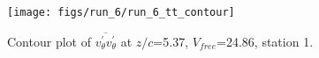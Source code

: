 \begin{figure}[H]
\centering
\texttt{[image: figs/run\_6/run\_6\_tt\_contour]}
\caption{Contour plot of $\overline{v_{\theta}^{\prime} v_{\theta}^{\prime}}$ at $z/c$=5.37, $V_{free}$=24.86, station 1.}
\label{fig:run_6_tt_contour}
\end{figure}


